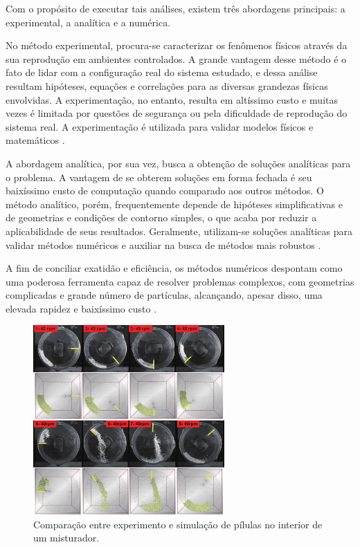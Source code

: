 Com o propósito de executar tais análises, existem três abordagens principais: a experimental, a analítica e a numérica. 

No método experimental, procura-se caracterizar os fenômenos físicos através da sua reprodução em ambientes controlados. A grande vantagem desse método é o fato de lidar com a configuração real do sistema estudado, e dessa análise resultam hipóteses, equações e correlações para as diversas grandezas físicas envolvidas. A experimentação, no entanto, resulta em altíssimo custo e muitas vezes é limitada por questões de segurança ou pela dificuldade de reprodução do sistema real. A experimentação é utilizada para validar modelos físicos e matemáticos \cite{bib:maliska}.

A abordagem analítica, por sua vez, busca a obtenção de soluções analíticas para o problema. A vantagem de se obterem soluções em forma fechada é seu baixíssimo custo de computação quando comparado aos outros métodos. O método analítico, porém, frequentemente depende de hipóteses simplificativas e de geometrias e condições de contorno simples, o que acaba por reduzir a aplicabilidade de seus resultados. Geralmente, utilizam-se soluções analíticas para validar métodos numéricos e auxiliar na busca de métodos mais robustos \cite{bib:maliska}.

A fim de conciliar exatidão e eficiência, os métodos numéricos despontam como uma poderosa ferramenta capaz de resolver problemas complexos, com geometrias complicadas e grande número de partículas, alcançando, apesar disso, uma elevada rapidez e baixíssimo custo \cite{bib:maliska}.

\begin{figure}[h]
	\caption{Comparação entre experimento e simulação de pílulas no interior de um misturador.}
	\vspace{-0.5cm}
	\begin{center}
		\includegraphics[width=0.65\textwidth]{images/pellet_flow.png}
	\end{center}
	\vspace{-0.2cm}
	\label{fig:pellet_flow}
\end{figure}

